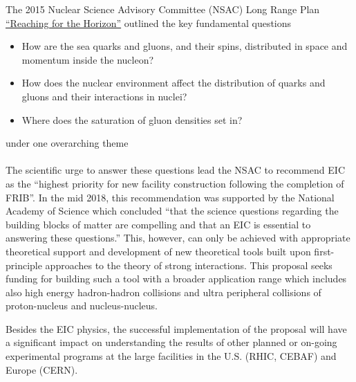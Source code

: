 
The 2015 Nuclear Science Advisory Committee (NSAC) Long Range Plan
\href{https://science.energy.gov/np/nsac/}
{``Reaching  for the Horizon''} outlined the key fundamental  questions{\it 
\begin{itemize}
	\item [] How are the sea quarks and gluons, and their spins, distributed in
		space and momentum inside the nucleon? 
	\item [ ] How does the nuclear environment affect the distribution of
		quarks and gluons and their interactions in nuclei?
	\item [] Where does the saturation of gluon densities set in?
\end{itemize}}
\noindent 
under one overarching theme \\
 \\ \noindent 
The scientific  urge to answer these questions lead the NSAC 
to recommend EIC as the ``highest priority for new facility construction
following the completion of FRIB''. In the mid 2018, this recommendation 
was supported by the National Academy of Science which  concluded 
``that the science questions
regarding the building blocks of matter are compelling and that an EIC is
essential to answering these questions.'' 
This, however, can only be achieved   
with appropriate theoretical support %
and development of new theoretical tools built upon 
first-principle approaches  to 
the theory of strong interactions. 
This proposal seeks funding for building such a tool 
with a broader application range which includes also high energy hadron-hadron 
collisions and ultra peripheral collisions  of proton-nucleus and nucleus-nucleus.   

Besides the EIC physics, 
the successful implementation of the proposal will have a significant impact on 
understanding the results of other planned or on-going experimental programs  at the large 
facilities in the U.S. (RHIC, CEBAF) and Europe (CERN). 




